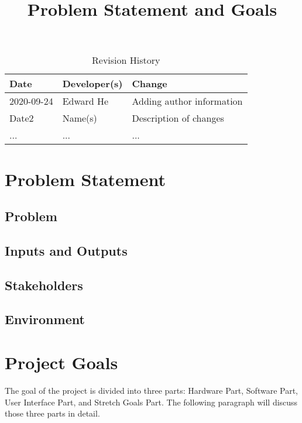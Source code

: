 \documentclass{article}
\title{Problem Statement and Goals\\\progname}
\author{\authname}
\date{}
\begin{document}
\maketitle

\begin{table}[hp]
\caption{Revision History} \label{TblRevisionHistory}
\begin{tabularx}{\textwidth}{llX}
\toprule
\textbf{Date} & \textbf{Developer(s)} & \textbf{Change}\\
\midrule
2020-09-24 & Edward He & Adding author information\\
Date2 & Name(s) & Description of changes\\
... & ... & ...\\
\bottomrule
\end{tabularx}
\end{table}

\section{Problem Statement}


\subsection{Problem}

\subsection{Inputs and Outputs}


\subsection{Stakeholders}

\subsection{Environment}


\section{Project Goals}
The goal of the project is divided into three parts: Hardware Part, Software Part, User Interface Part, and Stretch Goals Part. The following paragraph will discuss those three parts in detail. 
\end{document}
